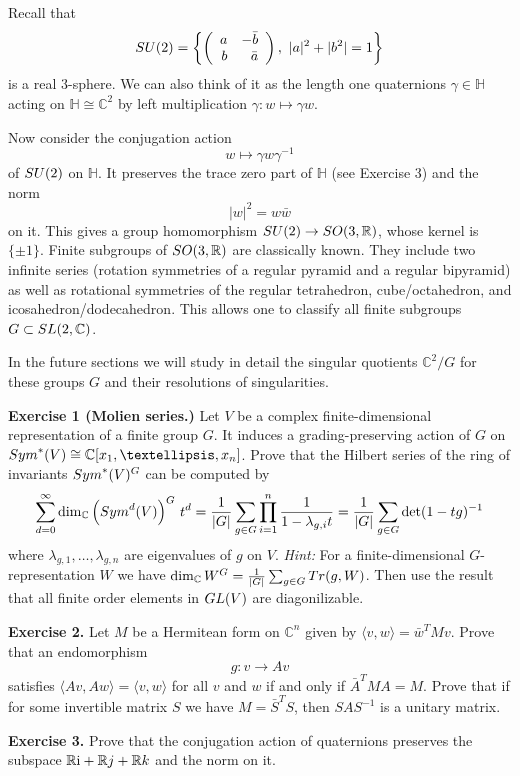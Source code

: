 \documentclass[11pt]{article}
\numberwithin{equation}{section}
\numberwithin{footnote}{section}
\newcommand{\ii}{{\mathrm i}}
\newcommand{\R}{{\mathbb R}}
\renewcommand{\H}{{\mathbb H}}
\newcommand{\C}{{\mathbb C}}
\begin{document}
\smallskip
Recall that 
$$
{\rm SU}(2) = \left\{\left(\begin{array}{rr} a&-\bar b\\
b&\bar a\end{array}\right),~|a|^2 + |b^2|=1\right\}
$$
is a real $3$-sphere. We can also think of it as the length one quaternions $\gamma\in \H$ acting on $\H\cong \C^2$ by 
left multiplication $\gamma :w\mapsto \gamma w$. 

\smallskip
Now consider the conjugation action
$$
w\mapsto \gamma w \gamma^{-1}
$$
of ${\rm SU}(2)$ on $\H$.
It preserves the trace zero part of $\H$ (see Exercise 3) and the norm
$$
|w|^2 = w \bar w
$$
on it. This gives a group homomorphism ${\rm SU(2)} \to {\rm SO}(3,\R)$, whose kernel is $\{\pm 1\}$. Finite subgroups of ${\rm SO}(3,\R)$ are classically known. They include two infinite series (rotation symmetries of a regular pyramid and a regular bipyramid) as well as rotational symmetries of the regular tetrahedron, cube/octahedron, and icosahedron/dodecahedron. 
This allows one to classify all finite subgroups $G\subset {\rm SL}(2,\C)$. 

\smallskip
In the future sections we will study in detail the singular quotients $\C^2/G$ for these groups $G$ and their resolutions of singularities.

\smallskip
{\bf Exercise 1 (Molien series.)} Let $V$ be a complex finite-dimensional representation of a finite group $G$. It induces a grading-preserving action of $G$ on ${\rm Sym}^*(V)\cong \C[x_1,\ldots,x_n]$. Prove that the Hilbert series of the ring of invariants ${\rm Sym}^*(V)^G$
can be computed by
$$
\sum_{d=0}^{\infty} \dim_\C\left({\rm Sym}^d(V)\right)^G\, t^d =
\frac 1{|G|}
\sum_{g\in G} \prod_{i=1}^n \frac {1}{1-\lambda_{g,i}t}
=\frac 1{|G|}
\sum_{g\in G} \det (1-tg)^{-1}
$$
where $\lambda_{g,1},\ldots,\lambda_{g,n}$ are eigenvalues of $g$ on $V$.  \emph{Hint:} For a finite-dimensional $G$-representation $W$ we have $\dim_\C W^G = \frac 1{|G|}\sum_{g\in G} {\rm Tr}(g,W)$. Then use the result that all finite order elements in ${\rm GL}(V)$ are diagonilizable.

{\bf Exercise 2.}
Let $M$ be a Hermitean form on $\C^n$ given by $\langle v,w\rangle = \bar w^T M v$. Prove that an endomorphism
$$
g: v\to Av
$$
satisfies 
$
\langle Av, Aw \rangle = \langle v, w \rangle 
$
for all $v$ and $w$ if and only if $\bar A^TMA = M$. Prove that if for some invertible matrix $S$ we have $M = \bar S^TS$, then
$S A S^{-1}$ is a unitary matrix.

{\bf Exercise 3.} 
Prove that the conjugation action of quaternions preserves the subspace $\R\ii + \R{\rm j} + \R{\rm k}$ and the norm on it.
\end{document}
